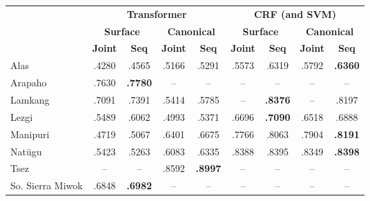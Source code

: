 \begin{table}[!tb]
    \centering
    \begin{tabular}{l|cc|cc|cc|cc}
          & \multicolumn{4}{c|}{\textbf{Transformer}} & \multicolumn{4}{c}{\textbf{CRF (and SVM)}} 
          \\
          & \multicolumn{2}{c|}{\textbf{Surface}} & \multicolumn{2}{c|}{\textbf{Canonical}}  & \multicolumn{2}{c|}{\textbf{Surface}} & \multicolumn{2}{c}{\textbf{Canonical}} 
          \\
          &  \textbf{Joint} & \textbf{Seq} &  \textbf{Joint} & \textbf{Seq} &  \textbf{Joint} & \textbf{Seq} &  \textbf{Joint} & \textbf{Seq} \\
         \hline
         Alas & .4280 & .4565 & .5166 & .5291 
              & .5573 & .6319 & .5792 & \textbf{.6360} \\
         \hline
         Arapaho & .7630 & \textbf{.7780} & -- & -- 
                 & -- & -- & -- & --  \\
         \hline
         Lamkang & .7091 & .7391 & .5414 & .5785 
         & -- & \textbf{.8376} & -- & .8197 \\
         \hline
         Lezgi  & .5489 & .6062 & .4993 & .5371 
                & .6696 & \textbf{.7090} & .6518 & .6888 \\
         \hline
         Manipuri & .4719 & .5067 & .6401 & .6675 
                  & .7766 & .8063 & .7904 & \textbf{.8191} \\
         \hline
         Natügu & .5423 & .5263 & .6083 & .6335 
                & .8388 & .8395 & .8349 & \textbf{.8398} \\
         \hline
         Tsez & -- & -- & .8592 & \textbf{.8997} 
              & -- & -- & -- & -- \\
         \hline
         So. Sierra Miwok & .6848 & \textbf{.6982} & -- & -- 
                          & -- & -- & -- & -- \\

\end{tabular}
\end{table}
